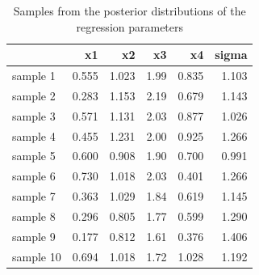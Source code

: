\documentclass[11pt,a4paper,twoside]{book}\usepackage[]{graphicx}\usepackage[]{color}
\newenvironment{knitrout}{}{} %
\begin{document}
\begin{knitrout}
\color{fgcolor}\begin{table}

\caption{\label{tab:simdata.postsample2}Samples from the posterior distributions of the regression parameters}
\centering
\begin{tabular}[t]{lrrrrr}
\toprule
  & x1 & x2 & x3 & x4 & sigma\\
\midrule
sample 1 & 0.555 & 1.023 & 1.99 & 0.835 & 1.103\\
sample 2 & 0.283 & 1.153 & 2.19 & 0.679 & 1.143\\
sample 3 & 0.571 & 1.131 & 2.03 & 0.877 & 1.026\\
sample 4 & 0.455 & 1.231 & 2.00 & 0.925 & 1.266\\
sample 5 & 0.600 & 0.908 & 1.90 & 0.700 & 0.991\\
sample 6 & 0.730 & 1.018 & 2.03 & 0.401 & 1.266\\
sample 7 & 0.363 & 1.029 & 1.84 & 0.619 & 1.145\\
sample 8 & 0.296 & 0.805 & 1.77 & 0.599 & 1.290\\
sample 9 & 0.177 & 0.812 & 1.61 & 0.376 & 1.406\\
sample 10 & 0.694 & 1.018 & 1.72 & 1.028 & 1.192\\
\bottomrule
\end{tabular}
\end{table}


\end{knitrout}
\end{document}
